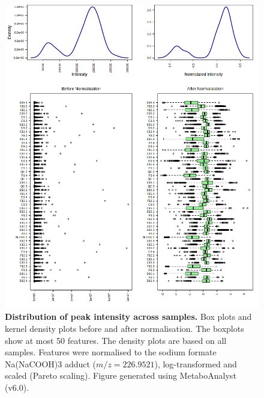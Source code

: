 \begin{figure}[htp!]
    \centering
    \includegraphics[width=\textwidth]{Figures/snorm_0_dpi72.png}
    \caption[Distribution of peak intensity across samples.]{\textbf{Distribution of peak intensity across samples.} Box plots and kernel density plots before and after normalisation. The boxplots show at most 50 features. The density plots are based on all samples. Features were normalised to the sodium formate Na(NaCOOH)3 adduct ($m/z=226.9521$), log-transformed and scaled (Pareto scaling). Figure generated using MetaboAnalyst (v6.0).}
    \label{fig:AllSamplesNormDis}
\end{figure}

\newpage